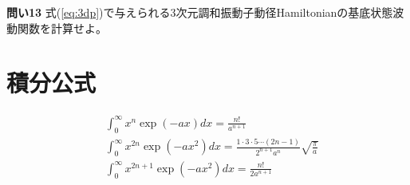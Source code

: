 \documentclass[11pt,pra,aps]{revtex4}
\begin{document}
\noindent
{\bf 問い13} 式(\ref{eq:3dp})で与えられる3次元調和振動子動径Hamiltonianの基底状態波動関数を計算せよ。

\section{積分公式}

\begin{align}
  &\int_0^\infty x^n \exp(-ax) dx = \frac{n!}{a^{n+1}} \\
  &\int_0^\infty x^{2n} \exp(-ax^2) dx = \frac{1\cdot3\cdot5\cdots(2n-1)}{2^{n+1}a^n}\sqrt{\frac{\pi}{a}} \\
  &\int_0^\infty x^{2n+1} \exp(-ax^2) dx = \frac{n!}{2 a^{n+1}}
\end{align}
\end{document}
